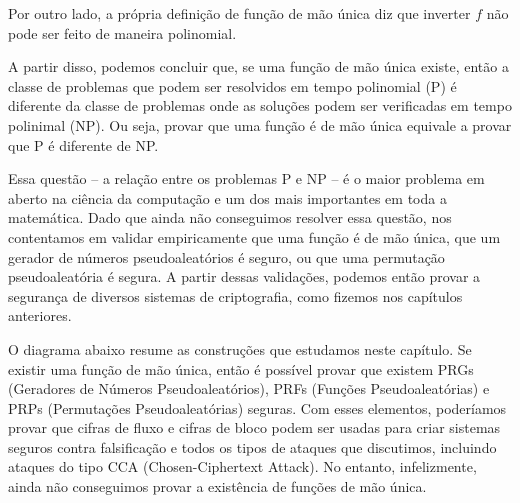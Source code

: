 Por outro lado, a própria definição de função de mão única diz que inverter $f$ não pode ser feito de maneira polinomial.

A partir disso, podemos concluir que, se uma função de mão única existe, então a classe de problemas que podem ser resolvidos em tempo polinomial (P) é diferente da classe de problemas onde as soluções podem ser verificadas em tempo polinimal (NP).
Ou seja, provar que uma função é de mão única equivale a provar que P é diferente de NP.

Essa questão -- a relação entre os problemas P e NP -- é o maior problema em aberto na ciência da computação e um dos mais importantes em toda a matemática.
Dado que ainda não conseguimos resolver essa questão, nos contentamos em validar empiricamente que uma função é de mão única, que um gerador de números pseudoaleatórios é seguro, ou que uma permutação pseudoaleatória é segura.
A partir dessas validações, podemos então provar a segurança de diversos sistemas de criptografia, como fizemos nos capítulos anteriores.

O diagrama abaixo resume as construções que estudamos neste capítulo.
Se existir uma função de mão única, então é possível provar que existem PRGs (Geradores de Números Pseudoaleatórios), PRFs (Funções Pseudoaleatórias) e PRPs (Permutações Pseudoaleatórias) seguras.
Com esses elementos, poderíamos provar que cifras de fluxo e cifras de bloco podem ser usadas para criar sistemas seguros contra falsificação e todos os tipos de ataques que discutimos, incluindo ataques do tipo CCA (Chosen-Ciphertext Attack).
No entanto, infelizmente, ainda não conseguimos provar a existência de funções de mão única.


\begin{center}
\end{center}

